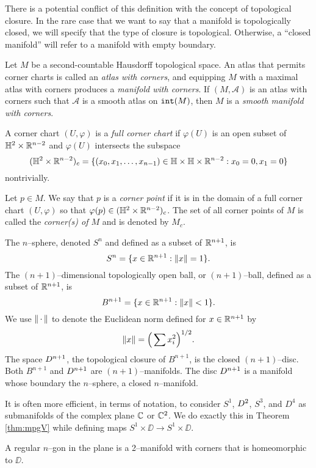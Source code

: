There is a potential conflict of this definition with the concept of topological closure.
In the rare case that we want to say that a manifold is topologically closed, we will specify that the type of closure is topological.
Otherwise, a ``closed manifold'' will refer to a manifold with empty boundary.

\begin{defn}
	Let $M$ be a second-countable Hausdorff topological space.
	An atlas that permits corner charts is called an \emph{atlas with corners}, and equipping $M$ with a maximal atlas with corners produces a \emph{manifold with corners}.
	If $(M,\mathcal{A})$ is an atlas with corners such that $\mathcal{A}$ is a smooth atlas on $\mathtt{int}(M)$, then $M$ is a \emph{smooth manifold with corners}.
	
	A corner chart $(U,\varphi)$ is a \emph{full corner chart} if $\varphi(U)$ is an open subset of $\mathbb{H}^2\times\mathbb{R}^{n-2}$ and $\varphi(U)$ intersects the subspace 
	\[
		(\mathbb{H}^2\times\mathbb{R}^{n-2})_c = \{(x_0,x_1,\dots,x_{n-1})\in\mathbb{H}\times\mathbb{H}\times\mathbb{R}^{n-2}:x_0=0,x_1=0\}
	\]
	nontrivially.
	
	Let $p\in M$.
	We say that $p$ is a \emph{corner point} if it is in the domain of a full corner chart $(U,\varphi)$ so that $\varphi(p)\in(\mathbb{H}^2\times\mathbb{R}^{n-2})_c$.
	The set of all corner points of $M$ is called the \emph{corner(s) of $M$} and is denoted by $M_c$.
\end{defn}

\begin{ex}
	The $n$--sphere, denoted $S^n$ and defined as a subset of $\mathbb{R}^{n+1}$, is
	\[
	S^n = \{x\in\mathbb{R}^{n+1}:\left\lVert x \right\rVert=1\}.
	\]
	The $(n+1)$--dimensional topologically open ball, or $(n+1)$--ball, defined as a subset of $\mathbb{R}^{n+1}$, is
	\[
	B^{n+1} = \{x\in\mathbb{R}^{n+1}:\left\lVert x \right\rVert< 1\}.
	\]
	We use $\left\lVert \,\cdot\, \right\rVert$ to denote the Euclidean norm defined for $x\in\mathbb{R}^{n+1}$ by
	\[
	\left\lVert x \right\rVert = \Big( \sum x_i^2 \Big)^{1/2}.
	\]
	The space $D^{n+1}$, the topological closure of $B^{n+1}$, is the closed $(n+1)$--disc.
	Both $B^{n+1}$ and $D^{n+1}$ are $(n+1)$--manifolds.
	The disc $D^{n+1}$ is a manifold whose boundary the $n$--sphere, a closed $n$--manifold.
	
	It is often more efficient, in terms of notation, to consider $S^1$, $D^2$, $S^3$, and $D^4$ as submanifolds of the complex plane $\mathbb{C}$ or $\mathbb{C}^2$.
	We do exactly this in Theorem \ref{thm:mpgV} while defining maps $S^1\times\DD\to S^1\times\DD$.
	
	A regular $n$--gon in the plane is a 2--manifold with corners that is homeomorphic to $\DD$.
\end{ex}

